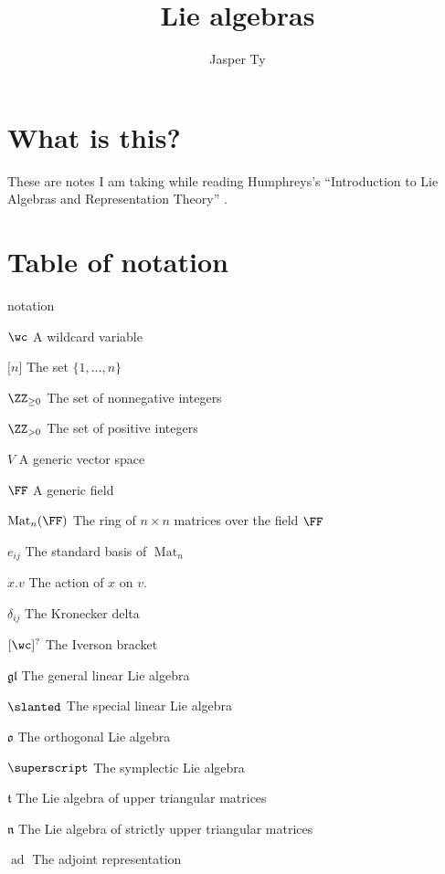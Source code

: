 \documentclass{article}
\title{Lie algebras}
\author{Jasper Ty}
\date{}
\DeclareMathOperator{\Mat}{Mat}
\newcommand*\ad{\operatorname{ad}}
\newcommand*\gl{\ensuremath{\mathfrak{gl}}}
\let\sl\slanted
\newcommand*\sl{\ensuremath{\mathfrak{sl}}}
\let\sp\superscript
\newcommand*\sp{\ensuremath{\mathfrak{sp}}}
\newcommand*\talg{\ensuremath{\mathfrak{t}}}
\newcommand*\nalg{\ensuremath{\mathfrak{n}}}
\newcommand*\oalg{\ensuremath{\mathfrak{o}}}
\newcommand*\acts{.}
\begin{document}
\maketitle

\section*{What is this?}

These are notes I am taking while reading Humphreys's ``Introduction to Lie Algebras and Representation Theory'' \cite{Hum72}.

\tableofcontents

\newpage

\section*{Table of notation}

\begin{labeling}{notation}
    \item [$\wc$]
        A wildcard variable
    \item [$\lbrack n \rbrack$]
        The set $\{1, \ldots, n\}$
    \item [$\ZZ_{\geq 0}$]
        The set of nonnegative integers
    \item [$\ZZ_{>0}$]
        The set of positive integers
    \item [$V$]
        A generic vector space
    \item [$\FF$]
        A generic field
    \item [$\Mat_n(\FF)$]
        The ring of $n \times n$ matrices over the field $\FF$
    \item [$e_{ij}$]
        The standard basis of $\Mat_n$
    \item [$x \acts v$]
        The action of $x$ on $v$.
    \item [$\delta_{ij}$]
        The Kronecker delta
    \item [$\lbrack \wc \rbrack^?$]
        The Iverson bracket
    \item [$\gl$]
        The general linear Lie algebra
    \item [$\sl$]
        The special linear Lie algebra
    \item [$\oalg$]
        The orthogonal Lie algebra
    \item [$\sp$]
        The symplectic Lie algebra
    \item [$\talg$]
        The Lie algebra of upper triangular matrices
    \item [$\nalg$]
        The Lie algebra of strictly upper triangular matrices
    \item [$\ad$]
        The adjoint representation
\end{labeling}
\end{document}
